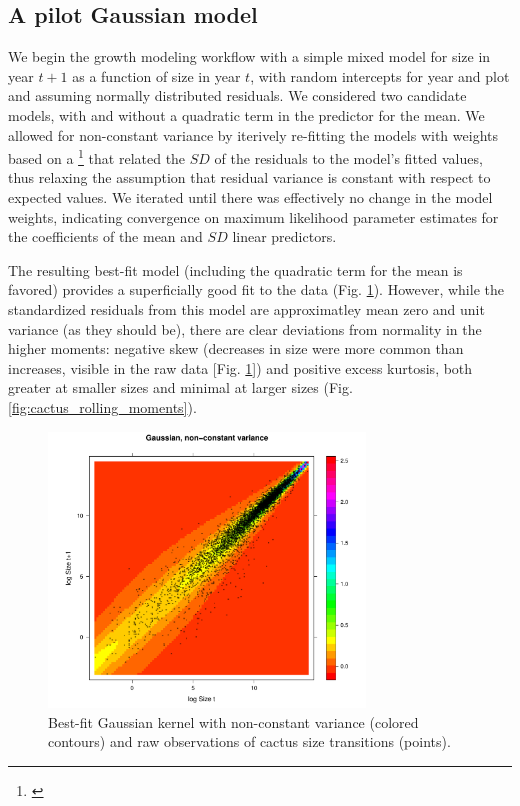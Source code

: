 \documentclass[11pt]{article}
\newcommand{\tom}[2]{{\color{red}{#1}}\footnote{\textit{\color{red}{#2}}}}
\begin{document}
{\subsection{A pilot Gaussian model}
We begin the growth modeling workflow with a simple mixed model for size in year $t+1$ as a function of size in year $t$, with random intercepts for year and plot and assuming normally distributed residuals. 
We considered two candidate models, with and without a quadratic term in the predictor for the mean.
We allowed for non-constant variance by iterively re-fitting the models with weights based on a \tom{third-order polynomial}{We came to a third-order only after working through the rest of the steps and finding some extra curvature in the sigma parameter -- not sure how much to go there. Of course, gam() would circumvent the issue entirely.} that related the $SD$ of the residuals to the model's fitted values, thus relaxing the assumption that residual variance is constant with respect to expected values. 
We iterated until there was effectively no change in the model weights, indicating convergence on maximum likelihood parameter estimates for the coefficients of the mean and $SD$ linear predictors. 

The resulting best-fit model (including the quadratic term for the mean is favored) provides a superficially good fit to the data (Fig. \ref{fig:cactus_kernel_gaussian}). 
However, while the standardized residuals from this model are approximatley mean zero and unit variance (as they should be), there are clear deviations from normality in the higher moments: negative skew (decreases in size were more common than increases, visible in the raw data [Fig. \ref{fig:cactus_kernel_gaussian}]) and positive excess kurtosis, both greater at smaller sizes and minimal at larger sizes (Fig. \ref{fig:cactus_rolling_moments}). 

\begin{figure}
\centering
\includegraphics[width=0.75\textwidth]{figures/cactus_kernel_gaussian}
\caption{Best-fit Gaussian kernel with non-constant variance (colored contours) and raw observations of cactus size transitions (points).}
\label{fig:cactus_kernel_gaussian}
\end{figure} 

}
\end{document}
